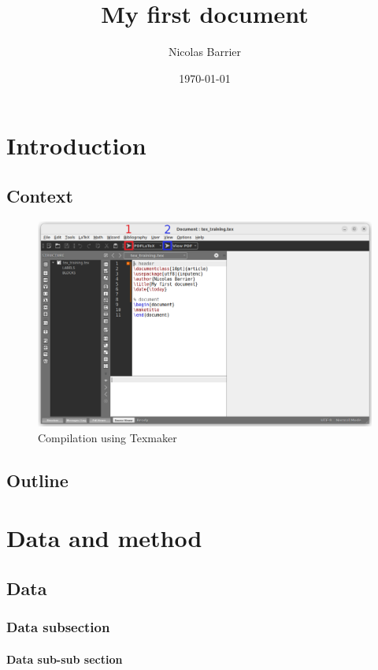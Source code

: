 \documentclass[12pt]{book}
\title{My first document}
\author{Nicolas Barrier}
\date{\today}
\begin{document}


\maketitle
\dominitoc
\pagestyle{empty} %
\tableofcontents

\clearpage

\pagestyle{mystyle}
\chapter{Introduction}
\minitoc
\lipsum
\section{Context}
\lipsum

\begin{figure}[h!]
    \centering
    \includegraphics[width=0.5\linewidth]{figs/texmaker-1.png}
    \caption{Compilation using Texmaker}
\end{figure}


\section{Outline}


\chapter{Data and method}
\label{chap:data-method}
\minitoc

\section{Data}
\subsection{Data subsection}
\subsubsection{Data sub-sub section}
\lipsum[1-3]
\end{document}
